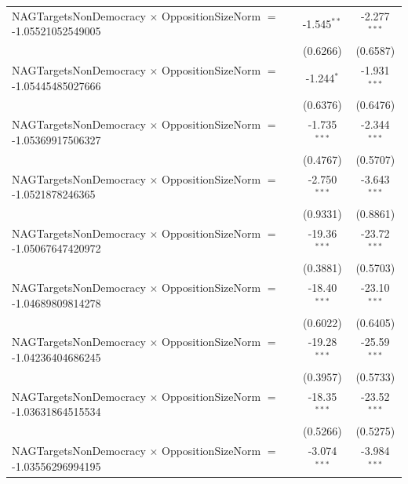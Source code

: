 \begin{tabular}{lcc}
   NAGTargetsNonDemocracy $\times$ OppositionSizeNorm $=$ -1.05521052549005     & -1.545$^{**}$        & -2.277$^{***}$\\   
                                                                                & (0.6266)             & (0.6587)\\   
   NAGTargetsNonDemocracy $\times$ OppositionSizeNorm $=$ -1.05445485027666     & -1.244$^{*}$         & -1.931$^{***}$\\   
                                                                                & (0.6376)             & (0.6476)\\   
   NAGTargetsNonDemocracy $\times$ OppositionSizeNorm $=$ -1.05369917506327     & -1.735$^{***}$       & -2.344$^{***}$\\   
                                                                                & (0.4767)             & (0.5707)\\   
   NAGTargetsNonDemocracy $\times$ OppositionSizeNorm $=$ -1.0521878246365      & -2.750$^{***}$       & -3.643$^{***}$\\   
                                                                                & (0.9331)             & (0.8861)\\   
   NAGTargetsNonDemocracy $\times$ OppositionSizeNorm $=$ -1.05067647420972     & -19.36$^{***}$       & -23.72$^{***}$\\   
                                                                                & (0.3881)             & (0.5703)\\   
   NAGTargetsNonDemocracy $\times$ OppositionSizeNorm $=$ -1.04689809814278     & -18.40$^{***}$       & -23.10$^{***}$\\   
                                                                                & (0.6022)             & (0.6405)\\   
   NAGTargetsNonDemocracy $\times$ OppositionSizeNorm $=$ -1.04236404686245     & -19.28$^{***}$       & -25.59$^{***}$\\   
                                                                                & (0.3957)             & (0.5733)\\   
   NAGTargetsNonDemocracy $\times$ OppositionSizeNorm $=$ -1.03631864515534     & -18.35$^{***}$       & -23.52$^{***}$\\   
                                                                                & (0.5266)             & (0.5275)\\   
   NAGTargetsNonDemocracy $\times$ OppositionSizeNorm $=$ -1.03556296994195     & -3.074$^{***}$       & -3.984$^{***}$\\   

\end{tabular}
